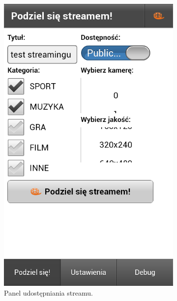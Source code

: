 \begin{figure}[h]
    \centering
    \begin{subfigure}{0.4\textwidth}
        \centering
        \includegraphics[width=\textwidth]{img/screens/mobile_broadcaster/panel-udostepniania-streamu.png}
        \caption{Panel udostępniania streamu.}
        \label{fig:MB1}
    \end{subfigure}
    \quad
    \begin{subfigure}{0.4\textwidth}
        \centering

\end{subfigure}
\end{figure}
